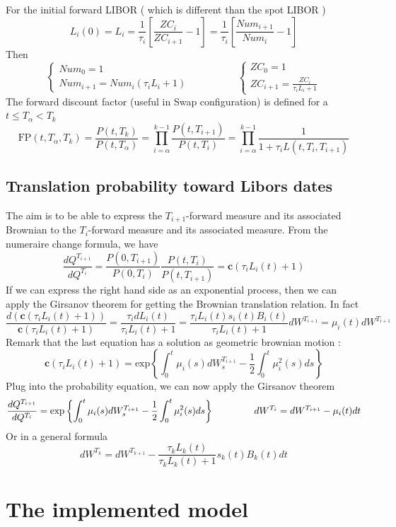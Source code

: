 \documentclass[a4paper,10pt]{article}
\newcommand{\Ti}{T_{i}}
\newcommand{\Ta}{T_{\alpha}}
\newcommand{\Tii}{T_{i+1}}
\newcommand{\Pti}{P(t,T_{i})}
\newcommand{\Ptii}{P(t,T_{i+1})}
\newcommand{\Lti}{L(t,\Ti,\Tii)}
\newcommand{\Lit}{L_{i}(t)}
\newcommand{\ZCi}{ZC_{i}}
\newcommand{\ZCii}{ZC_{i+1}}
\newcommand{\Numi}{Num_{i}}
\newcommand{\Numii}{Num_{i+1}}
\begin{document}
For the initial forward LIBOR ( which is different than the spot LIBOR )
\[
L_i(0) = L_i = \frac{1}{\tau_i} \left[ \frac{\ZCi}{\ZCii} - 1  \right] = \frac{1}{\tau_i} \left[ \frac{\Numii}{\Numi} - 1  \right]
\]
Then
\[
\left\{
\begin{array}{l}
Num_0 = 1 \\
\Numii = \Numi(\tau_i L_i +1)
\end{array}
\right.
\hspace{2cm}
\left\{
\begin{array}{l}
ZC_0 = 1 \\
\ZCii = \frac{\ZCi}{\tau_i L_i +1}
\end{array}
\right.
\]
The forward discount factor (useful in Swap configuration) is defined for a $t\leq \Ta < T_k$
\[
\text{FP}(t,\Ta,T_k)= \frac{P(t,T_k)}{P(t,\Ta)}
 = \prod^{k-1}_{i=\alpha} \frac{\Ptii}{\Pti} 
 = \prod^{k-1}_{i=\alpha} \frac{1}{1+\tau_i \Lti }
\]
\subsection{Translation probability toward Libors dates}
The aim is to be able to express the $\Tii$-forward measure and its associated Brownian to the $\Ti$-forward measure and its associated measure. From the numeraire change formula, we have
\[
\frac{dQ^{\Tii}}{dQ^{\Ti}} = \frac{P(0,\Tii)}{P(0,\Ti)}\frac{\Pti}{\Ptii} = \textbf{c} (\tau_i \Lit + 1 )
\]
If we can express the right hand side as an exponential process, then we can apply the Girsanov theorem for getting the Brownian translation relation. In fact
\[
\frac{d (\textbf{c} (\tau_i \Lit + 1 )) }{\textbf{c} (\tau_i \Lit + 1 )} 
= \frac{\tau_i d\Lit }{\tau_i \Lit +1} = \frac{\tau_i \Lit s_i(t) B_i(t) }{\tau_i \Lit +1} dW^{\Tii} = \mu_i(t)dW^{\Tii}
\]
Remark that the last equation has a solution as geometric brownian motion :
\[
\textbf{c} (\tau_i \Lit + 1 ) = \text{exp} \left\{ \int_0^t \mu_i(s)dW^{\Tii}_s - \frac{1}{2}\int_0^t \mu^2_i(s)ds \right\}
\]
Plug into the probability equation, we can now apply the Girsanov theorem
\[
\frac{dQ^{\Tii}}{dQ^{\Ti}} = \text{exp} \left\{ \int_0^t \mu_i(s)dW^{\Tii}_s - \frac{1}{2}\int_0^t \mu^2_i(s)ds \right\}
\hspace{1.5cm}
dW^{\Ti} = dW^{\Tii} - \mu_i(t)dt
\]
Or in a general formula
\[
dW^{T_{k}} = dW^{T_{k+1}} - \frac{\tau_k L_k(t)}{\tau_k L_k(t) +1}  s_k(t) B_k(t) dt
\]

\section{The implemented model}
\end{document}
